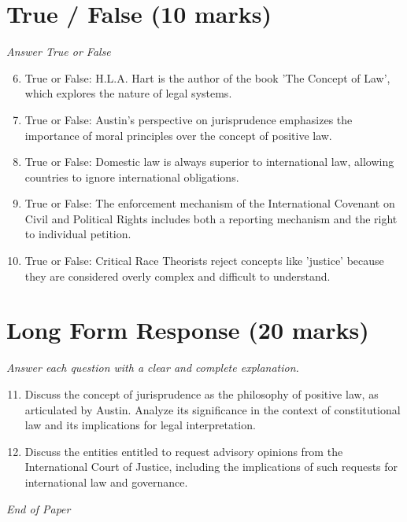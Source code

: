 \documentclass[12pt]{article}
\begin{document}
\section*{True / False (10 marks)}
\textit{Answer True or False}
\begin{enumerate}[label=\arabic*.]
\setcounter{enumi}{5}
\item True or False: H.L.A. Hart is the author of the book 'The Concept of Law', which explores the nature of legal systems.
\item True or False: Austin's perspective on jurisprudence emphasizes the importance of moral principles over the concept of positive law.
\item True or False: Domestic law is always superior to international law, allowing countries to ignore international obligations.
\item True or False: The enforcement mechanism of the International Covenant on Civil and Political Rights includes both a reporting mechanism and the right to individual petition.
\item True or False: Critical Race Theorists reject concepts like 'justice' because they are considered overly complex and difficult to understand.
\end{enumerate}

\section*{Long Form Response (20 marks)}
\textit{Answer each question with a clear and complete explanation.}
\begin{enumerate}[label=\arabic*.]
\setcounter{enumi}{10}
\item Discuss the concept of jurisprudence as the philosophy of positive law, as articulated by Austin. Analyze its significance in the context of constitutional law and its implications for legal interpretation.
\item Discuss the entities entitled to request advisory opinions from the International Court of Justice, including the implications of such requests for international law and governance.
\end{enumerate}

\vfill
\noindent\textit{End of Paper}
\end{document}
